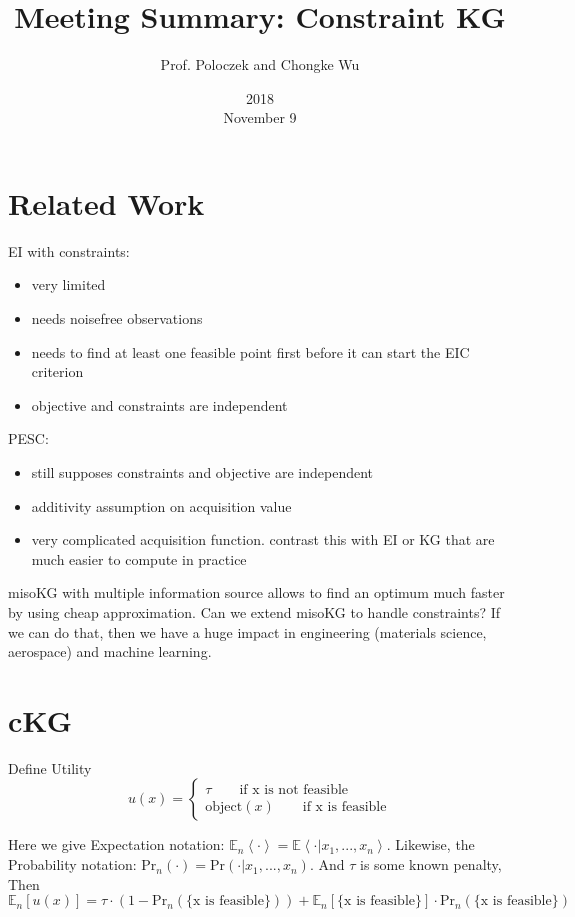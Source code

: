 \documentclass[12pt]{article}
\title{Meeting Summary: Constraint KG}
\date{2018\\ November 9}
\author{Prof. Poloczek and Chongke Wu}
\begin{document}
\maketitle
\section{Related Work}
EI with constraints:
\begin{itemize}
	\item very limited
	\item needs noisefree observations
	\item needs to find at least one feasible point first before it can start the EIC criterion
	\item objective and constraints are independent 
\end{itemize}

PESC: 
\begin{itemize}
	\item still supposes constraints and objective are independent
	\item additivity assumption on acquisition value
	\item very complicated acquisition function. contrast this with EI or KG that are much easier to compute in practice 
\end{itemize}

misoKG with multiple information source allows to find an optimum much faster by using cheap approximation. Can we extend misoKG to handle constraints? If we can do that, then we have a huge impact in engineering (materials science, aerospace) and machine learning.

\section{cKG}
Define Utility
\begin{equation*}
 u(x)=\left\{
\begin{aligned}
\tau \qquad \text{if x is not feasible} \\
\text{object}(x) \qquad \text{if x is feasible} 
\end{aligned}
\right.
\end{equation*}

Here we give Expectation notation: $\mathbb{E}_n\left\langle \cdot\right\rangle = \mathbb{E}\left\langle \cdot|x_1,...,x_n\right\rangle $.
Likewise, the Probability notation: $\text{Pr}_n(\cdot) = \text{Pr}(\cdot|x_1,...,x_n)$. And $\tau$ is some known penalty, Then
\begin{equation*}
\mathbb{E}_n[u(x)] = \tau\cdot(1 - \text{Pr}_n(\{\text{x is feasible}\})) +  \mathbb{E}_n[\{\text{x is feasible}\}]\cdot\text{Pr}_n(\{\text{x is feasible}\})
\end{equation*}
\end{document}

